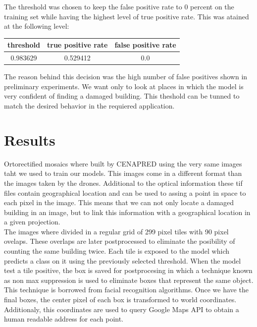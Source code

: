 The threshold was chosen to keep the false positive rate to 0 percent on the training set while having the highest level of true positive rate. This was atained at the following level:

\begin{center}
  \begin{tabular}{|c|c|c|}
    \hline
    threshold & true positive rate & false positive rate \\ \hline
    0.983629 & 0.529412 & 0.0 \\
    \hline
  \end{tabular}
\end{center}

The reason behind this decision was the high number of false positives shown in preliminary experiments. We want only to look at places in which the model is very confident of finding a damaged building. This theshold can be tunned to match the desired behavior in the requiered application.

\section{Results}

Ortorectified mosaics where built by CENAPRED using the very same images taht we used to train our models. This images come in a different format than the images taken by the drones. Additional to the optical information these tif files contain geographical location and can be used to assing a point in space to each pixel in the image. This means that we can not only locate a damaged building in an image, but to link this information with a geographical location in a given projection.\\

The images where divided in a regular grid of 299 pixel tiles with 90 pixel ovelaps. These overlaps are later postprocessed to eliminate the posibility of counting the same building twice. Each tile is exposed to the model which predicts a class on it using the previously selected threshold. When the model test a tile positive, the box is saved for postprocesing in which a technique known as non max suppression is used to eliminate boxes that represent the same object. This technique is borrowed from facial recognition algorithms. Once we have the final boxes, the center pixel of each box is transformed to world coordinates. Additionaly, this coordinates are used to query Google Maps API to obtain a human readable address for each point.


